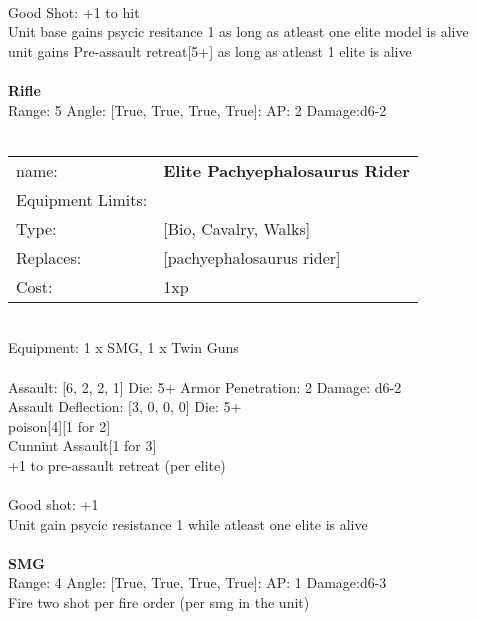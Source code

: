 \ \\
Good Shot: +1 to hit\\ 
Unit base gains psycic resitance 1 as long as atleast one elite model is alive\\ 
unit gains Pre-assault retreat[5+] as long as atleast 1 elite is alive\\ 

\ \\
{\bf Rifle } \\



Range: 5  Angle: [True, True, True, True]: AP: 2 Damage:d6-2 \\




 
\ \\

\noindent
\begin{tabular}{ll}
name: &{\bf Elite Pachyephalosaurus Rider } \\
Equipment Limits: & \\
Type: &[Bio, Cavalry, Walks] \\
Replaces: &[pachyephalosaurus rider] \\
Cost: & 1xp\\
\end{tabular}
\ \\
Equipment: 1 x SMG, 1 x Twin Guns \\
\ \\
Assault: [6, 2, 2, 1] Die: 5+ Armor Penetration: 2 Damage: d6-2 \\
Assault Deflection: [3, 0, 0, 0] Die: 5+\\
\indent poison[4][1 for 2]\\ 
Cunnint Assault[1 for 3]\\ 
+1 to pre-assault retreat (per elite)\\ 
 
\ \\
Good shot: +1\\ 
Unit gain psycic resistance 1 while atleast one elite is alive\\ 

\ \\
{\bf SMG } \\



Range: 4  Angle: [True, True, True, True]: AP: 1 Damage:d6-3 \\
Fire two shot per fire order (per smg in the unit)\\ 





